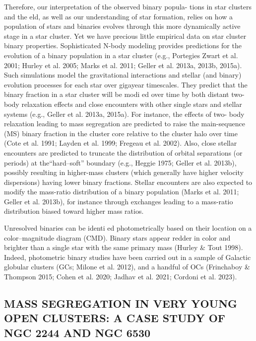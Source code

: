 \documentclass[../main.tex]{subfiles}
\begin{document}
{Therefore, our interpretation of the observed binary popula-
tions in star clusters and the eld, as well as our understanding
of star formation, relies on how a population of stars and
binaries evolves through this more dynamically active stage in
a star cluster. Yet we have precious little empirical data on star
cluster binary properties.
Sophisticated N-body modeling provides predictions for the
evolution of a binary population in a star cluster (e.g., Portegies
Zwart et al. 2001; Hurley et al. 2005; Marks et al. 2011; Geller
et al. 2013a, 2013b, 2015a). Such simulations model the
gravitational interactions and stellar (and binary) evolution
processes for each star over gigayear timescales. They predict
that the binary fraction in a star cluster will be modi ed over
time by both distant two-body relaxation effects and close
encounters with other single stars and stellar systems (e.g.,
Geller et al. 2013a, 2015a). For instance, the effects of two-
body relaxation leading to mass segregation are predicted to
raise the main-sequence (MS) binary fraction in the cluster core relative to the cluster halo over time (Cote et al. 1991; Layden
et al. 1999; Fregeau et al. 2002). Also, close stellar encounters
are predicted to truncate the distribution of orbital separations
(or periods) at the“hard–soft” boundary (e.g., Heggie 1975;
Geller et al. 2013b), possibly resulting in higher-mass clusters
(which generally have higher velocity dispersions) having
lower binary fractions. Stellar encounters are also expected to
modify the mass-ratio distribution of a binary population
(Marks et al. 2011; Geller et al. 2013b), for instance through
exchanges leading to a mass-ratio distribution biased toward
higher mass ratios.

Unresolved binaries can be identi ed photometrically based
on their location on a color–magnitude diagram (CMD). Binary
stars appear redder in color and brighter than a single star with
the same primary mass (Hurley & Tout 1998). Indeed,
photometric binary studies have been carried out in a sample
of Galactic globular clusters (GCs; Milone et al. 2012), and a
handful of OCs (Frinchaboy & Thompson 2015; Cohen et al.
2020; Jadhav et al. 2021; Cordoni et al. 2023).

\subsection{MASS SEGREGATION IN VERY YOUNG OPEN CLUSTERS:
	A CASE STUDY OF NGC 2244 AND NGC 6530}


}
\end{document}

